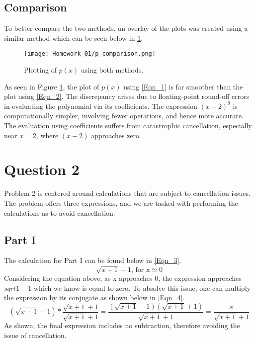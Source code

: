 \documentclass{article}
\begin{document}
\subsection{Comparison}
To better compare the two methods, an overlay of the plots was created using a similar method which can be seen below in \ref{fig:p_comparison}.
\begin{figure}[h!]
    \centering
    \texttt{[image: Homework\_01/p\_comparison.png]}
    \caption{Plotting of \(p(x)\) using both methods.}
    \label{fig:p_comparison}
\end{figure}
As seen in Figure \ref{fig:p_comparison}, the plot of \(p(x)\) using \ref{Eqn_1} is far smoother than the plot using \ref{Eqn_2}.
The discrepancy arises due to floating-point round-off errors in evaluating the polynomial via its coefficients. The expression \( (x-2)^9 \) is computationally simpler, involving fewer operations, and hence more accurate. The evaluation using coefficients suffers from catastrophic cancellation, especially near \(x=2\), where \( (x-2) \) approaches zero.


\section{Question 2}
Problem 2 is centered around calculations that are subject to cancellation issues. The problem offers three expressions, and we are tasked with performing the calculations as to avoid cancellation.

\subsection{Part I}
The calculation for Part I can be found below in \ref{Eqn_3}.
\begin{equation}
    \label{Eqn_3}
    \sqrt{x+1} - 1\mbox{, for x} \simeq \mbox{0}
\end{equation}
Considering the equation above, as x approaches 0, the expression approaches \(sqrt{1} -1\) which we know is equal to zero. To absolve this issue, one can multiply the expression by its conjugate as shown below in \ref{Eqn_4}.
\begin{equation}
    \label{Eqn_4}
    (\sqrt{x+1} - 1)*\frac{\sqrt{x+1}+1}{\sqrt{x+1}+1} = \frac{(\sqrt{x+1} - 1)(\sqrt{x+1}+1)}{\sqrt{x+1}+1} = \frac{x}{\sqrt{x+1}+1}
\end{equation}
As shown, the final expression includes no subtraction, therefore avoiding the issue of cancellation.
\end{document}
